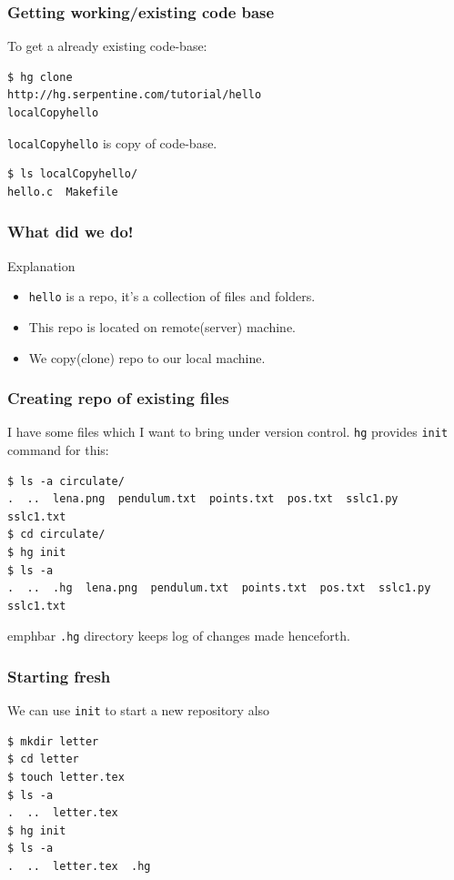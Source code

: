 \documentclass[14pt,compress]{beamer}
\newcommand{\emphbar}[1]
{\begin{beamercolorbox}[rounded=true]{emphbar} 
      {#1}
 \end{beamercolorbox}
}
\newcommand{\typ}[1]{\lstinline{#1}}
\begin{document}
\begin{frame}[fragile]
  \frametitle{Getting working/existing code base}
  To get a already existing code-base:
  \begin{lstlisting}
$ hg clone 
http://hg.serpentine.com/tutorial/hello 
localCopyhello
  \end{lstlisting}
\typ{localCopyhello} is copy of code-base. 
  \begin{lstlisting}
$ ls localCopyhello/
hello.c  Makefile
  \end{lstlisting}
\end{frame}

\begin{frame}[fragile]
  \frametitle{What did we do!}
  \begin{block}{Explanation}
    \begin{itemize}
    \item<1-> \typ{hello} is a \alert{repo}, it's a collection of files and folders. 
    \item<2-> This repo is located on remote(\alert{server}) machine.    
    \item<3-> We copy(\alert{clone}) repo to our local machine.
    \end{itemize}    
  \end{block}
\end{frame}

\begin{frame}[fragile]
  \frametitle{Creating repo of existing files}
  I have some files which I want to bring under version control. \typ{hg} provides \alert{\typ{init}} command for this: 
  \begin{lstlisting}
$ ls -a circulate/
.  ..  lena.png  pendulum.txt  points.txt  pos.txt  sslc1.py  sslc1.txt
$ cd circulate/
$ hg init
$ ls -a
.  ..  .hg  lena.png  pendulum.txt  points.txt  pos.txt  sslc1.py  sslc1.txt    
  \end{lstlisting}
  \emphbar{\typ{.hg} directory keeps log of changes made henceforth.}
\end{frame}

\begin{frame}[fragile]
  \frametitle{Starting fresh}
  We can use \typ{init} to start a new repository also
  \begin{lstlisting}
$ mkdir letter
$ cd letter
$ touch letter.tex
$ ls -a
.  ..  letter.tex
$ hg init
$ ls -a
.  ..  letter.tex  .hg
  \end{lstlisting}
\end{frame}
\end{document}
